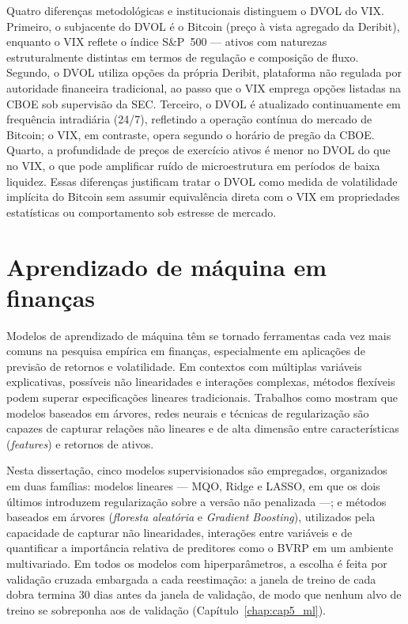 Quatro diferenças metodológicas e institucionais distinguem o DVOL do VIX. Primeiro, o subjacente do DVOL é o Bitcoin (preço à vista agregado da Deribit), enquanto o VIX reflete o índice S\&P~500 --- ativos com naturezas estruturalmente distintas em termos de regulação e composição de fluxo. Segundo, o DVOL utiliza opções da própria Deribit, plataforma não regulada por autoridade financeira tradicional, ao passo que o VIX emprega opções listadas na CBOE sob supervisão da SEC. Terceiro, o DVOL é atualizado continuamente em frequência intradiária (24/7), refletindo a operação contínua do mercado de Bitcoin; o VIX, em contraste, opera segundo o horário de pregão da CBOE. Quarto, a profundidade de preços de exercício ativos é menor no DVOL do que no VIX, o que pode amplificar ruído de microestrutura em períodos de baixa liquidez. Essas diferenças justificam tratar o DVOL como medida de volatilidade implícita do Bitcoin sem assumir equivalência direta com o VIX em propriedades estatísticas ou comportamento sob estresse de mercado.

\section{Aprendizado de máquina em finanças}

Modelos de aprendizado de máquina têm se tornado ferramentas cada vez mais
comuns na pesquisa empírica em finanças, especialmente em aplicações de previsão
de retornos e volatilidade. Em contextos com múltiplas variáveis explicativas,
possíveis não linearidades e interações complexas, métodos flexíveis podem
superar especificações lineares tradicionais. Trabalhos como \citet{Gu2020EmpiricalML}
mostram que modelos baseados em árvores, redes neurais e técnicas de regularização
são capazes de capturar relações não lineares e de alta dimensão entre
características (\textit{features}) e retornos de ativos.

Nesta dissertação, cinco modelos supervisionados são empregados, organizados
em duas famílias: modelos lineares --- MQO, Ridge e LASSO, em que os dois
últimos introduzem regularização sobre a versão não penalizada ---; e métodos
baseados em árvores (\textit{floresta aleatória} e \textit{Gradient Boosting}),
utilizados pela capacidade de capturar não linearidades, interações entre
variáveis e de quantificar a importância relativa de preditores como o BVRP em
um ambiente multivariado. Em todos os modelos com hiperparâmetros, a escolha é
feita por validação cruzada embargada a cada reestimação: a janela de treino de
cada dobra termina 30 dias antes da janela de validação, de modo que nenhum
alvo de treino se sobreponha aos de validação (Capítulo~\ref{chap:cap5_ml}).


